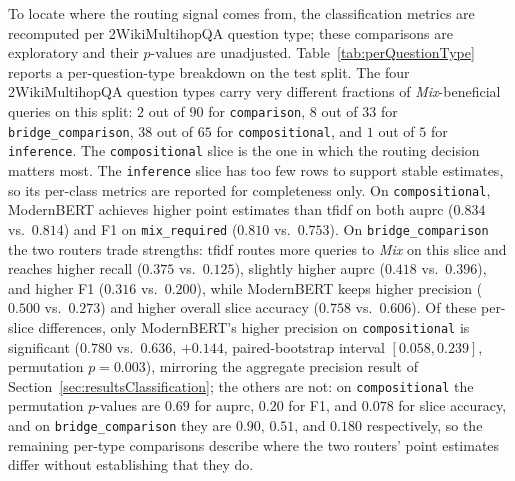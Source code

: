 \documentclass[english, bibtex]{kththesis}               %
\numberwithin{listing}{chapter}
\begin{document}
To locate where the routing signal comes from, the classification metrics are recomputed per 2WikiMultihopQA question type; these comparisons are exploratory and their $p$-values are unadjusted. Table~\ref{tab:perQuestionType} reports a per-question-type breakdown on the test split. The four 2WikiMultihopQA question types carry very different fractions of \emph{Mix}-beneficial queries on this split: $2$ out of $90$ for \texttt{comparison}, $8$ out of $33$ for \texttt{bridge\_comparison}, $38$ out of $65$ for \texttt{compositional}, and $1$ out of $5$ for \texttt{inference}. The \texttt{compositional} slice is the one in which the routing decision matters most. The \texttt{inference} slice has too few rows to support stable estimates, so its per-class metrics are reported for completeness only. On \texttt{compositional}, ModernBERT achieves higher point estimates than \gls{tfidf} on both \gls{auprc} ($0.834$ vs.\ $0.814$) and F1 on \texttt{mix\_required} ($0.810$ vs.\ $0.753$). On \texttt{bridge\_comparison} the two routers trade strengths: \gls{tfidf} routes more queries to \emph{Mix} on this slice and reaches higher recall ($0.375$ vs.\ $0.125$), slightly higher \gls{auprc} ($0.418$ vs.\ $0.396$), and higher F1 ($0.316$ vs.\ $0.200$), while ModernBERT keeps higher precision ($0.500$ vs.\ $0.273$) and higher overall slice accuracy ($0.758$ vs.\ $0.606$). Of these per-slice differences, only ModernBERT's higher precision on \texttt{compositional} is significant ($0.780$ vs.\ $0.636$, $+0.144$, paired-bootstrap interval $[0.058, 0.239]$, permutation $p = 0.003$), mirroring the aggregate precision result of Section~\ref{sec:resultsClassification}; the others are not: on \texttt{compositional} the permutation $p$-values are $0.69$ for \gls{auprc}, $0.20$ for F1, and $0.078$ for slice accuracy, and on \texttt{bridge\_comparison} they are $0.90$, $0.51$, and $0.180$ respectively, so the remaining per-type comparisons describe where the two routers' point estimates differ without establishing that they do.
\end{document}
